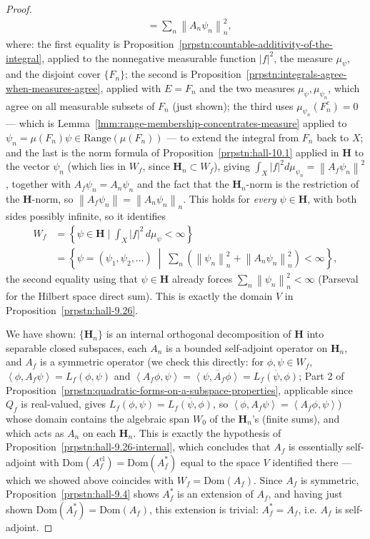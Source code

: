 \begin{proof}
\begin{align}
                &= \sum_n \left\| A_n \psi_n \right\|_n^2,
\end{align}
where: the first equality is Proposition~\ref{prpstn:countable-additivity-of-the-integral}, applied to the nonnegative measurable function $\lvert f \rvert^2$, the measure $\mu_\psi$, and the disjoint cover $\{F_n\}$; the second is Proposition~\ref{prpstn:integrals-agree-when-measures-agree}, applied with $E = F_n$ and the two measures $\mu_\psi, \mu_{\psi_n}$, which agree on all measurable subsets of $F_n$ (just shown); the third uses $\mu_{\psi_n}(F_n^c) = 0$ — which is Lemma~\ref{lmm:range-membership-concentrates-measure} applied to $\psi_n = \mu(F_n)\psi \in \text{Range}(\mu(F_n))$ — to extend the integral from $F_n$ back to $X$; and the last is the norm formula of Proposition~\ref{prpstn:hall-10.1} applied in $\mathbf{H}$ to the vector $\psi_n$ (which lies in $W_f$, since $\mathbf{H}_n \subset W_f$), giving $\int_X \lvert f \rvert^2 d\mu_{\psi_n} = \left\| A_f\psi_n \right\|^2$, together with $A_f\psi_n = A_n\psi_n$ and the fact that the $\mathbf{H}_n$-norm is the restriction of the $\mathbf{H}$-norm, so $\left\| A_f\psi_n \right\| = \left\| A_n\psi_n \right\|_n$. This holds for \textit{every} $\psi \in \mathbf{H}$, with both sides possibly infinite, so it identifies
\begin{align}
    W_f &= \left\{ \psi \in \mathbf{H} \mid \int_X \lvert f \rvert^2 \, d\mu_\psi < \infty \right\} \\
        &= \left\{ \psi = (\psi_1,\psi_2,\ldots) \;\middle|\; \sum_n \left( \left\| \psi_n \right\|_n^2 + \left\| A_n\psi_n \right\|_n^2 \right) < \infty \right\},
\end{align}
the second equality using that $\psi \in \mathbf{H}$ already forces $\sum_n \left\| \psi_n \right\|_n^2 < \infty$ (Parseval for the Hilbert space direct sum). This is exactly the domain $V$ in Proposition~\ref{prpstn:hall-9.26}.

We have shown: $\{\mathbf{H}_n\}$ is an internal orthogonal decomposition of $\mathbf{H}$ into separable closed subspaces, each $A_n$ is a bounded self-adjoint operator on $\mathbf{H}_n$, and $A_f$ is a symmetric operator (we check this directly: for $\phi, \psi \in W_f$, $\left< \phi, A_f\psi \right> = L_f(\phi,\psi)$ and $\left< A_f\phi, \psi \right> = \overline{\left< \psi, A_f\phi \right>} = \overline{L_f(\psi,\phi)}$; Part 2 of Proposition~\ref{prpstn:quadratic-forms-on-a-subspace-properties}, applicable since $Q_f$ is real-valued, gives $L_f(\phi,\psi) = \overline{L_f(\psi,\phi)}$, so $\left< \phi, A_f\psi \right> = \left< A_f\phi, \psi \right>$) whose domain contains the algebraic span $W_0$ of the $\mathbf{H}_n$'s (finite sums), and which acts as $A_n$ on each $\mathbf{H}_n$. This is exactly the hypothesis of Proposition~\ref{prpstn:hall-9.26-internal}, which concludes that $A_f$ is essentially self-adjoint with $\text{Dom}(A_f^{\text{cl}}) = \text{Dom}(A_f^*)$ equal to the space $V$ identified there — which we showed above coincides with $W_f = \text{Dom}(A_f)$. Since $A_f$ is symmetric, Proposition~\ref{prpstn:hall-9.4} shows $A_f^*$ is an extension of $A_f$, and having just shown $\text{Dom}(A_f^*) = \text{Dom}(A_f)$, this extension is trivial: $A_f^* = A_f$, i.e. $A_f$ is self-adjoint.


\end{proof}
